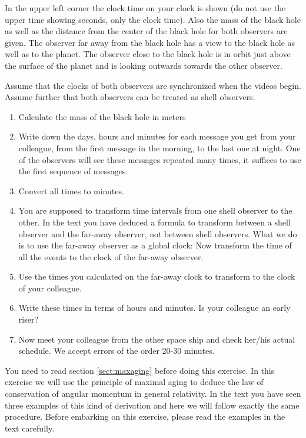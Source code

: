 {\begin{multicols}{2}
In the upper left corner the clock time on your clock is shown (do not use the upper time showing seconds, only the clock time). Also the mass of the black hole as well as the distance from the center of the black hole for both observers are given. The observer far away from the black hole has a view to the black hole as well as to the planet. The observer close to the black hole is in orbit just above the surface of the planet and is looking outwards towards the other observer.

Assume that the clocks of both observers are synchronized when the videos begin. Assume further that both observers can be treated as shell observers.

\begin{enumerate}
\item Calculate the mass of the black hole in meters
\item Write down the days, hours and minutes for each message you get from your colleague, from the first message in the morning, to the last one at night. One of the observers will see these messages repeated many times, it suffices to use the first sequence of messages.
\item Convert all times to minutes.
\item You are supposed to transform time intervals from one shell observer to the other. In the text you have deduced a formula to transform between a shell observer and the far-away observer, not between shell observers. What we do is to use the far-away observer as a global clock: Now transform the time of all the events to the clock of the far-away observer.
\item Use the times you calculated on the far-away clock to transform to the clock of your colleague.
\item Write these times in terms of hours and minutes. Is your colleague an early riser?
\item Now meet your colleague from the other space ship and check her/his actual schedule. We accept errors of the order 20-30 minutes.
\end{enumerate}







\vspace{0.5cm}


You need to read section \ref{sect:maxaging} before doing this exercise.
In this exercise we will use the principle of maximal aging to deduce the law of conservation of angular momentum in general relativity. In the text you have seen three examples of this kind of derivation and here we will follow exactly the same procedure. Before embarking on this exercise, please read the examples in the text carefully.


\end{multicols}}
